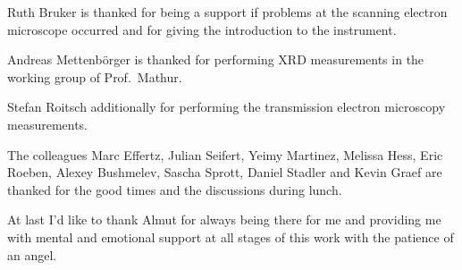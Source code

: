 \documentclass[\main/dresen_thesis.tex]{subfiles}
\begin{document}
	Ruth Bruker is thanked for being a support if problems at the scanning electron microscope occurred and for giving the introduction to the instrument.

	Andreas Mettenb\"orger is thanked for performing XRD measurements in the working group of Prof.\ Mathur.

	Stefan Roitsch additionally for performing the transmission electron microscopy measurements.

	The colleagues Marc Effertz, Julian Seifert, Yeimy Martinez, Melissa Hess, Eric Roeben, Alexey Bushmelev, Sascha Sprott, Daniel Stadler and Kevin Graef are thanked for the good times and the discussions during lunch.

	At last I'd like to thank Almut for always being there for me and providing me with mental and emotional support at all stages of this work with the patience of an angel.
\end{document}
